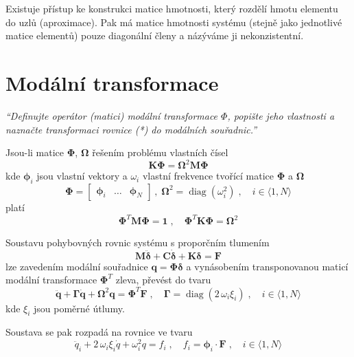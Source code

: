 \documentclass{article}
\begin{document}
	Existuje přístup ke konstrukci matice hmotnosti, který rozdělí hmotu elementu do uzlů (aproximace). Pak má matice hmotnosti systému (stejně jako jednotlivé matice elementů) pouze diagonální členy a názýváme ji nekonzistentní.

	\section{Modální transformace}
	\emph{``Definujte operátor (matici) modální transformace $\Phi$, popište jeho vlastnosti a naznačte transformaci rovnice (*) do modálních souřadnic.''}

	Jsou-li matice $\bm{\Phi}$, $\bm{\Omega}$ řešením problému vlastních čísel
	\begin{equation}
		\bm{K}\bm{\Phi} = \bm{\Omega}^2 \bm{M} \bm{\Phi}
	\end{equation}
	kde $\bm{\phi}_i$ jsou vlastní vektory a $\omega_i$ vlastní frekvence tvořící matice $\bm{\Phi}$ a $\bm{\Omega}$  
	\begin{equation}
		\bm{\Phi} = \begin{bmatrix} \bm{\phi}_i & \dots & \bm{\phi}_N \end{bmatrix}
		\,,\;
		\bm{\Omega}^2 = \operatorname{diag}(\omega_i^2)
		\;,\quad 
		i \in \langle 1,N \rangle
	\end{equation}
	platí
	\begin{equation}
		\bm{\Phi}^T\bm{M}\bm{\Phi} = \bm{1}
		\;,\quad 
		\bm{\Phi}^T\bm{K}\bm{\Phi} = \bm{\Omega}^2
	\end{equation}

	Soustavu pohybovných rovnic systému s proporčním tlumením
	\begin{equation}
		\bm{M}\bm{\ddot{\delta}} + \bm{C}\bm{\dot{\delta}} + \bm{K}\bm{\delta} = \bm{F}
	\end{equation}
	lze zavedením modální souřadnice $\bm{q} = \bm{\Phi}\bm{\delta}$ a vynásobením transponovanou maticí modální transformace $\bm{\Phi}^T$ zleva, převést do tvaru
	\begin{equation}
		\bm{\ddot{q}} + \bm{\Gamma}\bm{\dot{q}} + \bm{\Omega}^2 \bm{q} = \bm{\Phi}^T \bm{F}
		\;,\quad 
		\bm{\Gamma} = \operatorname{diag}(2\,\omega_i\xi_i) \;,\quad i \in \langle 1,N \rangle
	\end{equation}
	kde $\xi_i$ jsou poměrné útlumy.

	Soustava se pak rozpadá na rovnice ve tvaru
	\begin{equation}
		\ddot{q}_i + 2\,\omega_i\xi_i \dot{q} + \omega_i^2 q = f_i
		\;,\quad 
		f_i = \bm{\phi}_i \cdot \bm{F}
		\;,\quad 
		i \in \langle 1,N \rangle
	\end{equation}
\end{document}
